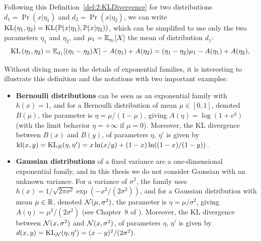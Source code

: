 Following this Definition~\ref{def:2:KLDivergence} for two distributions
$d_1=\Pr(x|\eta_1)$ and $d_2=\Pr(x|\eta_2)$,
we can write $\mathrm{KL}( \eta_1, \eta_2 ) = \mathrm{KL}(\mathbb{P}(x|\eta_1), \mathbb{P}(x|\eta_2))$, which can be simplified to use only the two parameters $\eta_1$ and $\eta_2$,
and $\mu_1 = \mathbb{E}_{\eta_1}[X]$ the mean of distribution $d_1$:
%
\begin{equation}\label{eq:2:Kullback-LeiblerDivergenceExpFamily2}
    \mathrm{KL}\left( \eta_1, \eta_2 \right) = \mathbb{E}_{d_1}[ (\eta_1 - \eta_2) X ] - A(\eta_1) + A(\eta_2) = (\eta_1 - \eta_2) \mu_1 - A(\eta_1) + A(\eta_2),
\end{equation}


Without diving more in the details of exponential families,
it is interesting to illustrate this definition and the notations with two important examples:
%
\begin{itemize}
    \item
    \textbf{Bernoulli distributions} can be seen as an exponential family with $h(x) = 1$,
    and for a Bernoulli distribution of mean $\mu\in[0,1]$, denoted $B(\mu)$,
    the parameter is $\eta = \mu / (1 - \mu)$, giving $A(\eta) = \log(1 + \mathrm{e}^{\eta})$
    (with the limit behavior $\eta=+\infty$ if $\mu=0$).
    Moreover, the KL divergence between $B(x)$ and $B(y)$, of parameters $\eta$, $\eta'$ is given by
    $\mathrm{kl}(x,y) = \mathrm{KL}_{B}(\eta,\eta') = x \ln(x/y) + (1-x) \ln((1-x)/(1-y))$.

    \item
    \textbf{Gaussian distributions} of a fixed variance are a one-dimensional exponential family,
    and in this thesis we do not consider Gaussian with an unknown variance.
    For a variance of $\sigma^2$, the family uses
    $h(x) = 1/\sqrt{2\pi\sigma^2} \exp(-x^2/(2\sigma^2))$,
    and for a Gaussian distribution with mean $\mu\in\mathbb{R}$, denoted $\mathcal{N}(\mu,\sigma^2)$,
    the parameter is $\eta = \mu/\sigma^2$, giving $A(\eta) = \mu^2/(2\sigma^2)$
    (see Chapter~8 of \cite{JordanCourseStatBerkeley}).
    Moreover, the KL divergence between $\mathcal{N}(x,\sigma^2)$ and $\mathcal{N}(x,\sigma^2)$, of parameters $\eta$, $\eta'$ is given by
    $d(x,y) = \mathrm{KL}_{\mathcal{N}}(\eta,\eta') = (x-y)^2 / (2\sigma^2)$.
\end{itemize}


